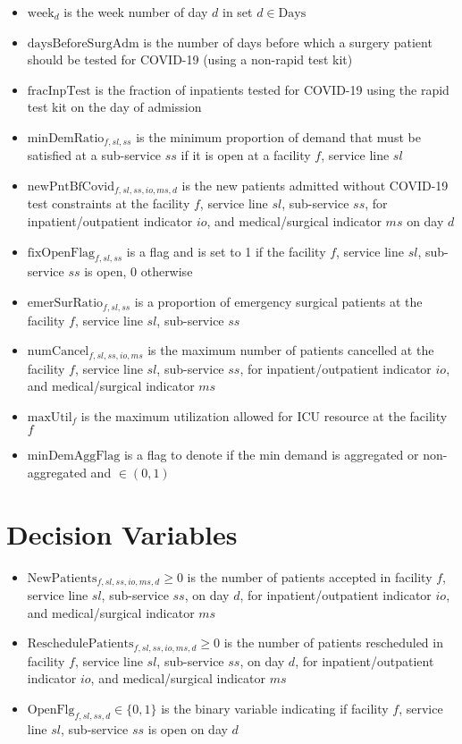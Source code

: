 \documentclass[10pt, letterpaper]{article}
\begin{document}
\begin{itemize}
\item[ ] $\text{week}_{d}$ is the week number of day $d$ in set $ d \in \text{Days}$
\item[ ] $\text{daysBeforeSurgAdm}$ is the number of days before which a surgery patient should be tested for COVID-19 (using a non-rapid test kit) 
\item[ ] $\text{fracInpTest}$ is the fraction of inpatients tested for COVID-19 using the rapid test kit on the day of admission 
\item[ ] $\text{minDemRatio}_{f,sl,ss}$ is the minimum proportion of demand that must be satisfied at a sub-service $ss$ if it is open at a facility $f$, service line $sl$ 
\item[ ] $\text{newPntBfCovid}_{f,sl,ss,io,ms,d}$ is the new patients admitted without COVID-19 test constraints at the facility $f$, service line $sl$, sub-service $ss$, for inpatient/outpatient indicator $io$, and medical/surgical indicator $ms$ on day $d$ 
\item[ ] $\text{fixOpenFlag}_{f,sl,ss}$ is a flag and is set to 1 if the facility $f$, service line $sl$, sub-service $ss$ is open, 0 otherwise
\item[ ] $\text{emerSurRatio}_{f,sl,ss}$ is a proportion of emergency surgical patients at the facility $f$, service line $sl$, sub-service $ss$
\item[ ] $\text{numCancel}_{f,sl,ss,io,ms}$ is the maximum number of patients cancelled at the facility $f$, service line $sl$, sub-service $ss$, for inpatient/outpatient indicator $io$, and medical/surgical indicator $ms$
\item[ ] $\text{maxUtil}_{f}$ is the maximum utilization allowed for ICU resource at the facility $f$
\item[ ] $\text{minDemAggFlag}$ is a flag to denote if the min demand is aggregated or non-aggregated and $ \in (0,1) $
\end{itemize}

\section*{Decision Variables}
\begin{itemize}
\item [ ] $\text{NewPatients}_{f,sl,ss,io,ms,d} \geq 0$ is the number of patients accepted in facility $f$, service line $sl$, sub-service $ss$, on day $d$, for inpatient/outpatient indicator $io$, and medical/surgical indicator $ms$
\item [ ] $\text{ReschedulePatients}_{f,sl,ss,io,ms,d} \geq 0$ is the number of patients rescheduled in facility $f$, service line $sl$, sub-service $ss$, on day $d$, for inpatient/outpatient indicator $io$, and medical/surgical indicator $ms$
\item [ ] $\text{OpenFlg}_{f,sl,ss,d} \in \{0,1\}$ is the binary variable indicating if facility $f$, service line $sl$, sub-service $ss$ is open on day $d$
\end{itemize}
\end{document}
